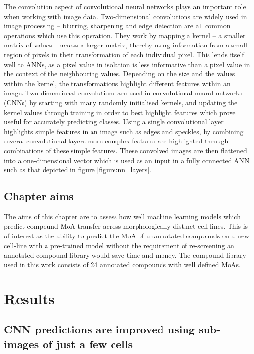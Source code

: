 \documentclass[a4paper,11pt,twoside,openright]{scrbook}
\begin{document}
The convolution aspect of convolutional neural networks plays an important role when working with image data.
Two-dimensional convolutions are widely used in image processing -- blurring, sharpening and edge detection are all 
common operations which use this operation.
They work by mapping a kernel -- a smaller matrix of values -- across a larger matrix, thereby using information from a 
small region of pixels in their transformation of each individual pixel.
This lends itself well to ANNs, as a pixel value in isolation is less informative than a pixel value in the context of 
the neighbouring values.
Depending on the size and the values within the kernel, the transformations highlight different features within an 
image.
Two dimensional convolutions are used in convolutional neural networks (CNNs) by starting with many randomly 
initialised kernels, and updating the kernel values through training in order to best highlight features which prove 
useful for accurately predicting classes.
Using a single convolutional layer highlights simple features in an image such as edges and speckles, by combining 
several convolutional layers more complex features are highlighted through combinations of these simple features.
These convolved images are then flattened into a one-dimensional vector which is used as an input in a fully connected 
ANN such as that depicted in figure \ref{figure:nn_layers}.


\subsection{Chapter aims}

The aims of this chapter are to assess how well machine learning models which predict compound MoA transfer across 
morphologically distinct cell lines.
This is of interest as the ability to predict the MoA of unannotated compounds on a new cell-line with a pre-trained 
model without the requirement of re-screening an annotated compound library would save time and money.
The compound library used in this work consists of 24 annotated compounds with well defined MoAs.



\section{Results}


\subsection{CNN predictions are improved using sub-images of just a few cells}
\end{document}
